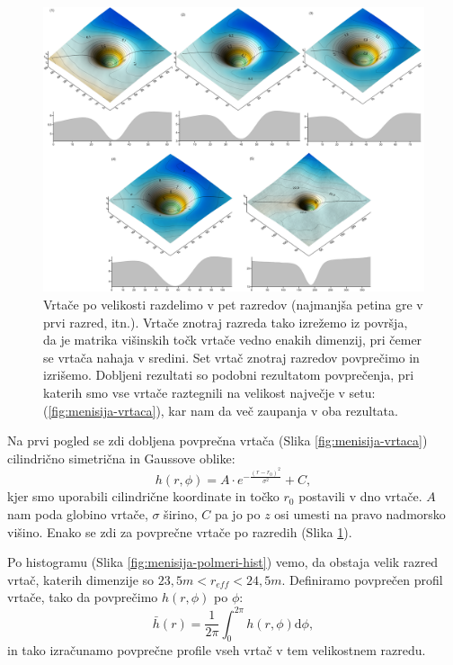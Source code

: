 \documentclass[a4paper, twoside, 12pt]{book}
\begin{document}
  \begin{figure}[h!]
    \begin{center}
      \includegraphics[width=14cm,angle=90]{slike/vrtace-po-razredih-menisija}
    \end{center}
    \caption{Vrtače po velikosti razdelimo v pet razredov (najmanjša petina gre v prvi razred, itn.). Vrtače znotraj razreda tako izrežemo iz površja, da je matrika višinskih točk vrtače vedno enakih dimenzij, pri čemer se vrtača nahaja v sredini. Set vrtač znotraj razredov povprečimo in izrišemo. Dobljeni rezultati so podobni rezultatom povprečenja, pri katerih smo vse vrtače raztegnili na velikost največje v setu: (\ref{fig:menisija-vrtaca}), kar nam da več zaupanja v oba rezultata.}
    \label{fig:menisija-vrtace-po-razredih}
  \end{figure}

Na prvi pogled se zdi dobljena povprečna vrtača (Slika \ref{fig:menisija-vrtaca}) cilindrično simetrična in Gaussove oblike:
\begin{equation}
  h(r,\phi) = A \cdot e^{-\frac{(r-r_0)^2}{\sigma^2}} + C,
  \label{fit-vrtace}
\end{equation}
kjer smo uporabili cilindrične koordinate in točko $r_0$ postavili v dno vrtače. $A$ nam poda globino vrtače, $\sigma$ širino, $C$ pa jo po $z$ osi umesti na pravo nadmorsko višino.
Enako se zdi za povprečne vrtače po razredih (Slika \ref{fig:menisija-vrtace-po-razredih}).

Po histogramu (Slika \ref{fig:menisija-polmeri-hist}) vemo, da obstaja velik razred vrtač, katerih dimenzije so $23,5m < r_{eff} < 24,5m$. Definiramo povprečen profil vrtače, tako da povprečimo $h(r,\phi)$ po $\phi$:
\begin{equation} 
  \bar h(r) = \frac{1}{2 \pi} \int_0^{2\pi} h(r,\phi) \mathrm{d}\phi,
  \label{povprecenje-phi}
\end{equation}
in tako izračunamo povprečne profile vseh vrtač v tem velikostnem razredu.
\end{document}
